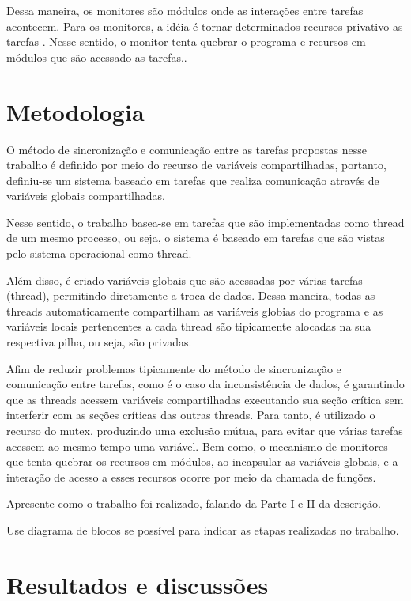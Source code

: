 \documentclass[journal]{IEEEtran}
\begin{document}
Dessa maneira, os monitores são módulos onde as interações entre tarefas acontecem. Para os monitores, a idéia é tornar determinados recursos privativo as tarefas \cite{IEEEhowto:romulo}. Nesse sentido, o monitor tenta quebrar o programa e recursos em módulos que são acessado as tarefas.. 

\section{Metodologia}

O método de sincronização e comunicação entre as tarefas propostas nesse trabalho é definido por meio do recurso de variáveis compartilhadas, portanto, definiu-se um sistema baseado em tarefas que realiza comunicação através de variáveis globais compartilhadas.

Nesse sentido, o trabalho basea-se em tarefas que são implementadas como thread de um mesmo processo, ou seja, o sistema é baseado em tarefas que são vistas pelo sistema operacional como thread.

Além disso,  é criado variáveis globais que são acessadas por várias tarefas (thread), permitindo diretamente a troca de dados. Dessa maneira, todas as threads automaticamente compartilham as variáveis globias do programa e as variáveis locais pertencentes a cada thread são tipicamente alocadas na  sua respectiva pilha, ou seja, são privadas. 

Afim de reduzir problemas tipicamente do método de sincronização e comunicação entre tarefas, como é o caso da inconsistência de dados, é garantindo que as threads acessem  variáveis compartilhadas executando sua seção crítica sem interferir com as seções críticas das outras threads. Para tanto, é utilizado o recurso do mutex, produzindo uma exclusão mútua, para evitar que várias tarefas acessem ao mesmo tempo uma variável. Bem como, o mecanismo de monitores que tenta quebrar os recursos em módulos, ao incapsular as variáveis globais, e a interação de acesso a esses recursos ocorre por meio da chamada de funções. 

Apresente como o trabalho foi realizado, falando da Parte I e II da descrição. 

Use diagrama de blocos se possível para indicar as etapas realizadas no trabalho.

\section{Resultados e discussões}
\end{document}
